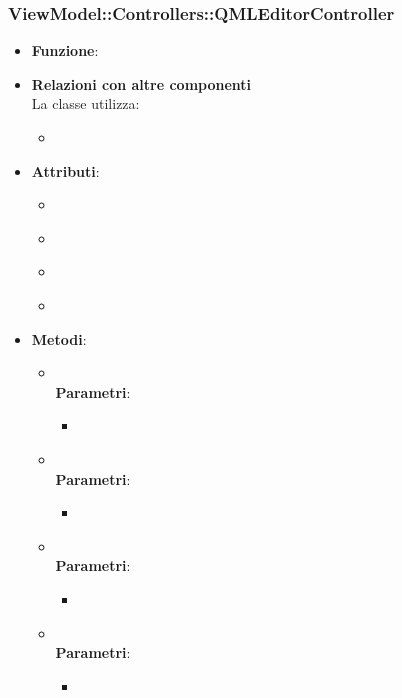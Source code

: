 \subsubsection{ViewModel::Controllers::QMLEditorController}
\begin{itemize}
\item\textbf{Funzione}:
\item\textbf{Relazioni con altre componenti}\\
La classe utilizza:
	\begin{itemize}
		\item
	\end{itemize}
\item\textbf{Attributi}:
	\begin{itemize}
		\item\code{}\\
		\item\code{}\\
		\item\code{}\\
		\item\code{}\\
	\end{itemize}
\item\textbf{Metodi}:
	\begin{itemize}
		\item\code{}\\
		\textbf{Parametri}:
			\begin{itemize}
				\item\code{}\\
			\end{itemize}
		\item\code{}\\
		\textbf{Parametri}:
			\begin{itemize}
				\item\code{}\\
			\end{itemize}
		\item\code{}\\
		\textbf{Parametri}:
			\begin{itemize}
				\item\code{}\\
			\end{itemize}
		\item\code{}\\
		\textbf{Parametri}:
			\begin{itemize}
				\item\code{}\\
			\end{itemize}
	\end{itemize}
\end{itemize}


